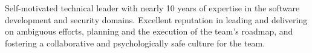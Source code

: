 

\begin{cvparagraph}

Self-motivated technical leader with nearly 10 years of expertise in the software development and security domains. Excellent reputation in leading and delivering on ambiguous efforts, planning and the execution of the team's roadmap, and fostering a collaborative and psychologically safe culture for the team.
\end{cvparagraph}
